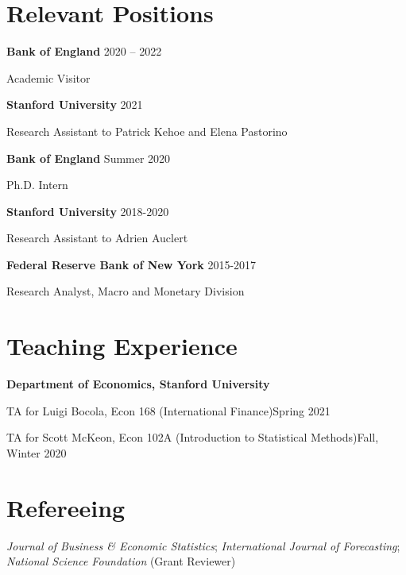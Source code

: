 \documentclass[margin,line]{res}                          %
\def\tinyskip{\vspace\tinyskipamount}
\newenvironment{list1}{
	\begin{list}{\ding{113}}{%
			\setlength{\itemsep}{0in}
			\setlength{\parsep}{0in} \setlength{\parskip}{0in}
			\setlength{\topsep}{0in} \setlength{\partopsep}{0in}
			\setlength{\leftmargin}{0.17in}}}{\end{list}}
\begin{document}
\begin{resume}
	
	\section{\sc Relevant Positions}
	\begin{list1}
		\item[] \textbf{Bank of England}  \hfill 2020 -- 2022\tinyskip
		\item[] {Academic Visitor}
		\smallskip
		\item[] \textbf{Stanford University}  \hfill 2021\tinyskip
		\item[] {Research Assistant to Patrick Kehoe and Elena Pastorino}
		\smallskip
		\item[] \textbf{Bank of England}  \hfill Summer 2020\tinyskip
		\item[] {Ph.D. Intern}
		\smallskip
		\item[] \textbf{Stanford University}  \hfill 2018-2020 \tinyskip
		\item[] {Research Assistant to Adrien Auclert}\smallskip
		\item[] \textbf{Federal Reserve Bank of New York}  \hfill 2015-2017 \tinyskip
		\item[] {Research Analyst, Macro and Monetary Division}
	\end{list1}
	
	
	\section{\sc Teaching Experience}
	\begin{list1}
		\item[] \textbf{Department of Economics, Stanford University} \smallskip
		\item[] TA for Luigi Bocola, Econ 168 (International Finance)\hfill Spring 2021\smallskip
		\item[] TA for Scott McKeon, Econ 102A (Introduction to Statistical Methods)\hfill Fall, Winter 2020\smallskip
	\end{list1}
	
	\section{\sc Refereeing}
	\begin{list1}
		\item[] \emph{Journal of Business \& Economic Statistics}; \emph{International Journal of Forecasting}; \emph{National Science Foundation} (Grant Reviewer) \smallskip
	\end{list1}
	

\end{resume}
\end{document}
